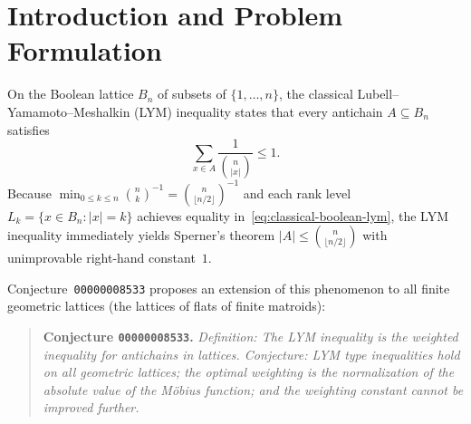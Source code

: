 \documentclass[11pt]{article}
\theoremstyle{definition}
\theoremstyle{remark}
\newcommand{\rk}{\mathrm{rk}}
\begin{document}
\begin{abstract}
\begin{enumerate}
\begin{itemize}
  \item The rank-normalized upper M\"obius weighting $|\mu(x, \hat{1})| / \sum_{\rk(y)=\rk(x)} |\mu(y, \hat{1})|$ violates LYM ($\le 1$) on the $922$-element rank-$5$ geometric lattice $L_{922} = \mathcal{L}(U_{3,8} \oplus_{e_0} U_{3,8})$, achieving $61/1825 + 441/455 = 23788/23725 > 1$.
  \item The rank-normalized lower M\"obius weighting $w_{\mathrm{low}}(x) = |\mu(\hat{0}, x)| / |w_{\rk(x)}(L)|$ fails optimality already on the $10$-element modular geometric lattice $L_{10} = B_1 \times M_3 = \mathcal{L}(U_{1,1} \oplus U_{2,3})$, where both $w_{\mathrm{unif}}$ and $w_{\mathrm{chain}}$ are valid tight LYM weightings yet $\min_{L_{10}^\circ} w_{\mathrm{low}} = 1/5 < 2/9 = \min_{L_{10}^\circ} w_{\mathrm{chain}} < 1/4 = \min_{L_{10}^\circ} w_{\mathrm{unif}}$.
  \end{itemize}
\end{enumerate}
All main theorems and concrete counterexamples are formally verified from first principles in Core Lean~4.19.0 with zero external dependencies and zero custom axioms, and independently checked in exact rational arithmetic.
\end{abstract}

\section{Introduction and Problem Formulation}

On the Boolean lattice $B_n$ of subsets of $\{1,\dots,n\}$, the classical Lubell--Yamamoto--Meshalkin (LYM) inequality \cite{Lubell1966,Meshalkin1963,Yamamoto1954} states that every antichain $A \subseteq B_n$ satisfies
\begin{equation}\label{eq:classical-boolean-lym}
  \sum_{x \in A} \frac{1}{\binom{n}{|x|}} \le 1.
\end{equation}
Because $\min_{0 \le k \le n} \binom{n}{k}^{-1} = \binom{n}{\lfloor n/2 \rfloor}^{-1}$ and each rank level $L_k = \{x \in B_n : |x| = k\}$ achieves equality in~\eqref{eq:classical-boolean-lym}, the LYM inequality immediately yields Sperner's theorem $|A| \le \binom{n}{\lfloor n/2 \rfloor}$ with unimprovable right-hand constant~$1$.

Conjecture~\texttt{00000008533} proposes an extension of this phenomenon to all finite geometric lattices (the lattices of flats of finite matroids):
\begin{quote}
\textbf{Conjecture \texttt{00000008533}.} \emph{Definition: The LYM inequality is the weighted inequality for antichains in lattices. Conjecture: LYM type inequalities hold on all geometric lattices; the optimal weighting is the normalization of the absolute value of the M\"obius function; and the weighting constant cannot be improved further.}
\end{quote}
\end{document}

